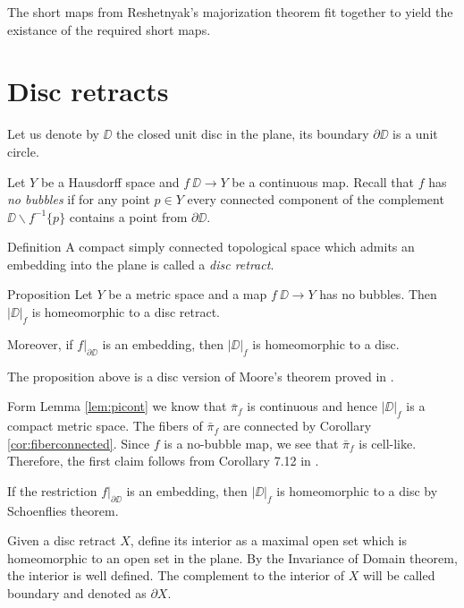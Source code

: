 \documentclass{article}
\begin{document}
The short maps from Reshetnyak's majorization theorem fit together to yield the existance of the required short maps.
\qeds







\section{Disc retracts}\label{Metric minimizing discs}



Let us denote by $\DD$ the closed unit disc in the plane,
its boundary $\partial \DD$ is a unit circle.

Let $Y$ be a Hausdorff space and
$f\:\DD\to Y$ be a continuous map.
Recall that $f$ has \emph{no bubbles}
if for any point $p\in Y$ every connected component of the complement $\DD\backslash f^{-1}\{p\}$ contains a point from $\partial \DD$.

\begin{thm}{Definition}
A compact simply connected topological space which admits an embedding into the plane is 
called a \emph{disc retract}. 
\end{thm}


\begin{thm}{Proposition}\label{prop:disc-moore}
Let $Y$ be a metric space and a map $f\:\DD\to Y$ has no bubbles.
Then $|\DD|_f$ is homeomorphic to a disc retract.

Moreover, if $f|_{\partial\DD}$ is an embedding, then $|\DD|_f$ is homeomorphic to a disc.
\end{thm}

The proposition above is a disc version of Moore's theorem \cite{moore} proved in \cite{LW3}.

Form Lemma \ref{lem:picont} we know that $\bar\pi_f$ is continuous and hence $|\DD|_f$
is a compact metric space. 
The fibers of $\bar\pi_f$ are connected by Corollary \ref{cor:fiberconnected}.
Since $f$ is a no-bubble map, we see that $\bar\pi_f$ is cell-like. 
Therefore, the first claim follows from 
Corollary 7.12 in \cite{LW3}.

If the restriction $f|_{\partial\DD}$ is an embedding, then $|\DD|_f$ is homeomorphic to a disc by Schoenflies theorem.
\qeds

Given a disc retract $X$,
define its interior as a maximal open set which is homeomorphic to an open set in the plane.
By the Invariance of Domain theorem, the interior is well defined.
The complement to the interior of $X$ will be called boundary and denoted as $\partial X$.
\end{document}
